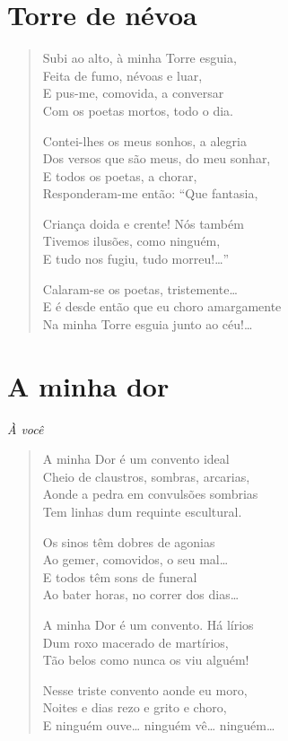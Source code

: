 \chapter{Torre de névoa}

\begin{verse}
Subi ao alto, à minha Torre esguia,\\
Feita de fumo, névoas e luar,\\
E pus-me, comovida, a conversar\\
Com os poetas mortos, todo o dia.

Contei-lhes os meus sonhos, a alegria\\
Dos versos que são meus, do meu sonhar,\\
E todos os poetas, a chorar,\\
Responderam-me então: “Que fantasia,

Criança doida e crente! Nós também\\
Tivemos ilusões, como ninguém,\\
E tudo nos fugiu, tudo morreu!\ldots{}”

Calaram-se os poetas, tristemente\ldots{}\\
E é desde então que eu choro amargamente\\
Na minha Torre esguia junto ao céu!\ldots{} 
\end{verse}

\chapter{A minha dor} 

\hfill{}\textit{À você} 

\begin{verse}
A minha Dor é um convento ideal\\
Cheio de claustros, sombras, arcarias,\\
Aonde a pedra em convulsões sombrias\\
Tem linhas dum requinte escultural.

Os sinos têm dobres de agonias\\
Ao gemer, comovidos, o seu mal\ldots{}\\
E todos têm sons de funeral\\
Ao bater horas, no correr dos dias\ldots{}

A minha Dor é um convento. Há lírios\\
Dum roxo macerado de martírios,\\
Tão belos como nunca os viu alguém! 

Nesse triste convento aonde eu moro,\\
Noites e dias rezo e grito e choro,\\
E ninguém ouve\ldots{} ninguém vê\ldots{} ninguém\ldots{}
\end{verse}

